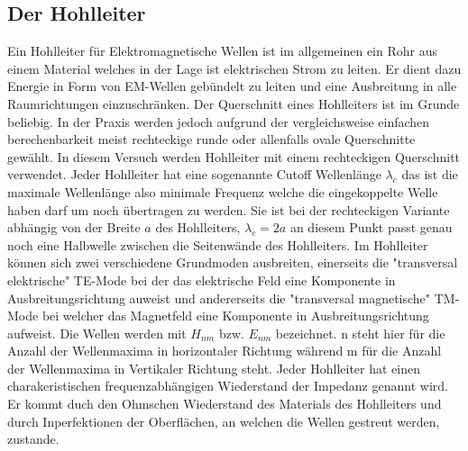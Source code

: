 \subsection{Der Hohlleiter}
\label{sec:thwellenleiter}
Ein Hohlleiter für Elektromagnetische Wellen ist im allgemeinen ein Rohr aus einem Material welches in der 
Lage ist elektrischen Strom zu leiten. Er dient dazu Energie in Form von EM-Wellen gebündelt zu leiten und
eine Ausbreitung in alle Raumrichtungen einzuschränken. Der Querschnitt eines Hohlleiters ist im Grunde 
beliebig. In der Praxis werden jedoch aufgrund der vergleichsweise einfachen berechenbarkeit meist rechteckige
runde oder allenfalls ovale Querschnitte gewählt. In diesem Versuch werden Hohlleiter mit einem rechteckigen
Querschnitt verwendet. Jeder Hohlleiter hat eine sogenannte Cutoff Wellenlänge $\lambda_c$ das ist die maximale
Wellenlänge also minimale Frequenz welche die eingekoppelte Welle haben darf um noch übertragen zu werden.
Sie ist bei der rechteckigen Variante abhängig von der Breite $a$ des Hohlleiters, $\lambda_c=2a$ an diesem Punkt
passt genau noch eine Halbwelle zwischen die Seitenwände des Hohlleiters. Im Hohlleiter können sich zwei verschiedene
Grundmoden ausbreiten, einerseits die "transversal elektrische" TE-Mode bei der das elektrische Feld eine Komponente
in Ausbreitungsrichtung auweist und andererseits die "transversal magnetische" TM-Mode bei welcher das Magnetfeld
eine Komponente in Ausbreitungsrichtung aufweist. Die Wellen werden mit $H_{nm}$ bzw. $E_{nm}$
bezeichnet. n steht hier für die Anzahl der Wellenmaxima in horizontaler Richtung während m für die Anzahl der 
Wellenmaxima in Vertikaler Richtung steht. Jeder Hohlleiter hat einen charakeristischen frequenzabhängigen
Wiederstand der Impedanz genannt wird. Er kommt duch den Ohmschen Wiederstand des Materials des Hohlleiters
und durch Inperfektionen der Oberflächen, an welchen die Wellen gestreut werden, zustande.

\subsection{}

